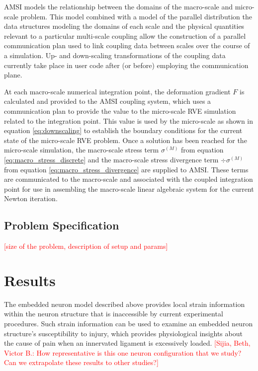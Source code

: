 \documentclass[]{interact}
\newcommand{\red}[1]{\textcolor{red}{[#1]}}
\begin{document}
AMSI models the relationship between the domains of the macro-scale and micro-scale problem. This model combined with a model of the parallel distribution the data structures modeling the domains of each scale and the physical quantities relevant to a particular multi-scale coupling allow the construction of a parallel communication plan used to link coupling data between scales over the course of a simulation. Up- and down-scaling transformations of the coupling data currently take place in user code after (or before) employing the communication plane.

At each macro-scale numerical integration point, the deformation gradient $F$ is calculated and provided to the AMSI coupling system, which uses a communication plan to provide the value to the micro-scale RVE simulation related to the integration point. This value is used by the micro-scale as shown in equation \ref{eq:downscaling} to establish the boundary conditions for the current state of the micro-scale RVE problem. Once a solution has been reached for the micro-scale simulation, the macro-scale stress term $\sigma^{(M)}$ from equation \ref{eq:macro_stress_discrete} and the macro-scale stress divergence term $\div \sigma^{(M)}$ from equation \ref{eq:macro_stress_divergence} are supplied to AMSI. These terms are communicated to the macro-scale and associated with the coupled integration point for use in assembling the macro-scale linear algebraic system for the current Newton iteration.


\subsection{Problem Specification}\label{sec:specification}
\red{size of the problem, description of setup and params}


\section{Results}
\label{sec:results}

The embedded neuron model described above provides local strain information within the neuron structure that is inaccessible by current experimental procedures. Such strain information can be used to examine an embedded neuron structure's susceptibility to injury, which provides physiological insights about the cause of pain when an innervated ligament is excessively loaded. \red{Sijia, Beth, Victor B.: How representative is this one neuron configuration that we study? Can we extrapolate these results to other studies?} 
\end{document}
